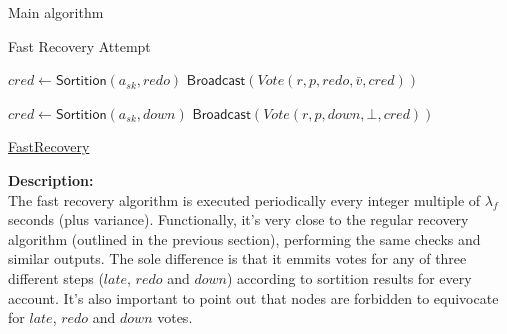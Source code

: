 \documentclass[10pt,a4paper]{article}
\begin{document}
\begin{section}{Main algorithm}
\begin{subsection}{Fast Recovery Attempt}
\begin{algorithm}[H]
\begin{algorithmic}[1]
                    \State $cred \gets 
                    \mathsf{Sortition}(a_{sk}, redo)$
                        \State $\mathsf{Broadcast}(Vote(r,p,redo,\bar{v}, cred))$
                    \EndIf

            \Else
                \State $cred \gets 
                \mathsf{Sortition}(a_{sk}, down)$
                    \State $\mathsf{Broadcast}(Vote(r,p,down,\bot, cred))$
                \EndIf
            \EndIf
        \EndFor

        \EndFunction
        \end{algorithmic}
        \caption{\underline{FastRecovery}}
    \end{algorithm}
    
    
    \noindent \textbf{Description:}\\
    The fast recovery algorithm is executed periodically every integer multiple of $\lambda_f$
    seconds (plus variance).
    Functionally, it's very close to the regular recovery algorithm (outlined in the previous section), 
    performing the same checks and similar outputs. The sole difference is that it emmits votes 
    for any of three different steps ($late$, $redo$ and $down$) according to sortition 
    results for every account.
    It's also important to point out that nodes are forbidden to equivocate for $late$, $redo$ and $down$ votes.
\end{subsection}


\end{section}
\end{document}
